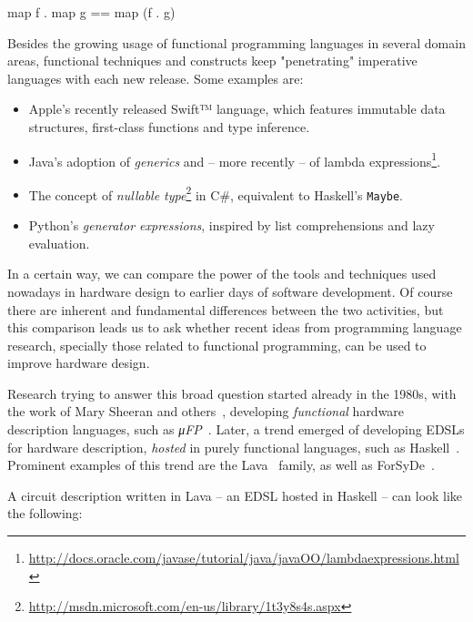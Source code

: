     \begin{haskellcode}
        map f . map g == map (f . g)
    \end{haskellcode}

    Besides the growing usage of functional programming languages in several domain areas,
    functional techniques and constructs keep "penetrating" imperative languages
    with each new release. Some examples are:

    \begin{itemize}
        \item Apple's recently released Swift™ language, which features immutable data structures,
            first-class functions and type inference.
        \item Java's adoption of \emph{generics} and – more recently – of lambda
            expressions\footnote{\url{http://docs.oracle.com/javase/tutorial/java/javaOO/lambdaexpressions.html}}.
        \item The concept of \emph{nullable type}\footnote{\url{http://msdn.microsoft.com/en-us/library/1t3y8s4s.aspx}}
            in C\#, equivalent to Haskell's \texttt{Maybe}.
        \item Python's \emph{generator expressions}, inspired by list comprehensions and lazy evaluation.
    \end{itemize}

    In a certain way, we can compare the power of the tools and techniques
    used nowadays in hardware design to earlier days of software development.
    Of course there are inherent and fundamental differences between the two activities, but
    this comparison leads us to ask whether recent ideas from programming language research,
    specially those related to functional programming, can be used to improve hardware design.

    Research trying to answer this broad question started already in the 1980s,
    with the work of Mary Sheeran and others~,
    developing \emph{functional} hardware description languages, such as \emph{μFP}~\cite{mufp-1984}.
    Later, a trend emerged of developing \acp{EDSL} for hardware description,
    \emph{hosted} in purely functional languages, such as Haskell~\cite{haskell2010}.
    Prominent examples of this trend are the Lava~\cite{lava-1999} family,
    as well as ForSyDe~\cite{forsyde1999}.

    A circuit description written in Lava – an \ac{EDSL} hosted in Haskell – can look like the following:

